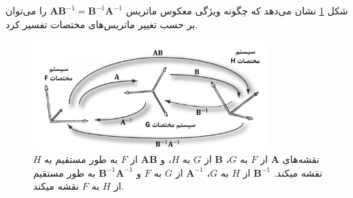 {\begin{spacing}{1.5}
        شکل \ref{fig:4.Session.1.3.14} نشان می‌دهد که چگونه ویژگی معکوس ماتریس $\textbf{AB}^{-1}=\textbf{B}^{-1}\textbf{A}^{-1}$ را می‌توان بر حسب تغییر ماتریس‌های مختصات تفسیر کرد.

        \begin{figure}[H]
            \centering
            \setlength{\belowcaptionskip}{-10pt}
            \includegraphics[width=0.8\textwidth]{Images/4/3/4.Session.1.3.14}
            \caption {نقشه‌های $\textbf{A}$ از $F$ به $G$، $\textbf{B}$ از $G$ به $H$، و $\textbf{AB}$ از $F$ به طور مستقیم به $H$ نقشه میکند. $\textbf{B}^{-1}$ از $H$ به $G$، $\textbf{A}^{-1}$ از $G$ به $F$ و $\textbf{B}^{-1}\textbf{A}^{-1}$ به طور مستقیم از $H$ به $F$ نقشه میکند.}
            \label{fig:4.Session.1.3.14}
        \end{figure}
    \end{spacing}
}


